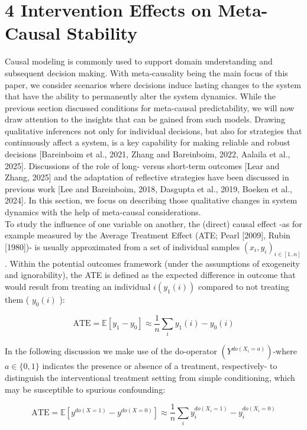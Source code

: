 \documentclass[10pt]{article}
\begin{document}
\section*{4 Intervention Effects on Meta-Causal Stability}
Causal modeling is commonly used to support domain understanding and subsequent decision making. With meta-causality being the main focus of this paper, we consider scenarios where decisions induce lasting changes to the system that have the ability to permanently alter the system dynamics. While the previous section discussed conditions for meta-causal predictability, we will now draw attention to the insights that can be gained from such models. Drawing qualitative inferences not only for individual decisions, but also for strategies that continuously affect a system, is a key capability for making reliable and robust decisions [Bareinboim et al., 2021, Zhang and Bareinboim, 2022, Aalaila et al., 2025]. Discussions of the role of long- versus short-term outcomes [Lear and Zhang, 2025] and the adaptation of reflective strategies have been discussed in previous work [Lee and Bareinboim, 2018, Dasgupta et al., 2019, Boeken et al., 2024]. In this section, we focus on describing those qualitative changes in system dynamics with the help of meta-causal considerations.\\[0pt]
To study the influence of one variable on another, the (direct) causal effect -as for example measured by the Average Treatment Effect (ATE; Pearl [2009], Rubin [1980])- is usually approximated from a set of individual samples $\left(x_{i}, y_{i}\right)_{i \in[1 . . n]}$. Within the potential outcomes framework (under the assumptions of exogeneity and ignorability), the ATE is defined as the expected difference in outcome that would result from treating an individual $i\left(y_{1}(i)\right)$ compared to not treating them ( $y_{0}(i)$ ):


\begin{equation*}
\mathrm{ATE}=\mathbb{E}\left[y_{1}-y_{0}\right] \approx \frac{1}{n} \sum_{i} y_{1}(i)-y_{0}(i) \tag{2}
\end{equation*}


In the following discussion we make use of the do-operator $\left(Y^{d o\left(X_{i}=a\right)}\right)$-where $a \in\{0,1\}$ indicates the presence or absence of a treatment, respectively- to distinguish the interventional treatment setting from simple conditioning, which may be susceptible to spurious confounding:


\begin{equation*}
\mathrm{ATE}=\mathbb{E}\left[y^{d o(X=1)}-y^{d o(X=0)}\right] \approx \frac{1}{n} \sum_{i} y_{i}^{d o\left(X_{i}=1\right)}-y_{i}^{d o\left(X_{i}=0\right)} \tag{3}
\end{equation*}
\end{document}
